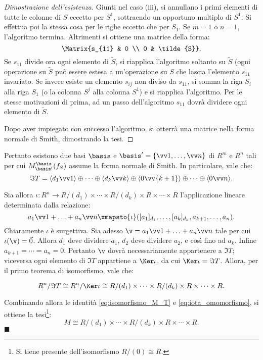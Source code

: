 \documentclass[12pt]{scrartcl}
\begin{document}
\begin{proof}[Dimostrazione dell'esistenza]
		
		Giunti nel caso (iii), si annullano i primi elementi di tutte le colonne
		di $S$ eccetto per $S^1$, sottraendo un opportuno multiplo di $S^1$. Si
		effettua poi la stessa cosa per le righe eccetto che per $S_1$. Se
		$m=1$ o $n=1$, l'algoritmo termina.
		Altrimenti si ottiene una matrice della forma:
		\[ \Matrix{s_{11} & 0 \\ 0 & \tilde{S}}. \]
		Se $s_{11}$ divide ora ogni elemento di $\tilde{S}$, si riapplica l'algoritmo
		soltanto su $\tilde{S}$ (ogni operazione su $\tilde{S}$ può essere estesa a
		un'operazione su $S$ che lascia l'elemento $s_{11}$ invariato. Se invece esiste
		un elemento $s_{ij}$ non diviso da $s_{11}$, si somma la riga $S_i$ alla
		riga $S_1$ (o la colonna $S^j$ alla colonna $S^1$) e si riapplica l'algoritmo.
		Per le stesse motivazioni di prima, ad un passo dell'algoritmo $s_{11}$ dovrà dividere
		ogni elemento di $\tilde{S}$. \medskip
		
		
		Dopo aver impiegato con successo l'algoritmo, si otterrà una matrice nella
		forma normale di Smith, dimostrando la tesi.
	\end{proof}
	
	Pertanto esistono due basi $\basis$ e $\basis' = \{ \vv 1, \ldots, \vv n \}$
	di $R^m$ e $R^n$ tali per cui $M^\basis_{\basis'}(f_S)$ assume la forma normale
	di Smith. In particolare, vale che:
	\[
		\Im T = \langle d_1 \vv 1 \rangle \oplus \cdots \oplus \langle d_k \vv k \rangle \oplus \langle 0 \vv{k+1} \rangle \oplus \cdots \oplus \langle 0 \vv n \rangle.
	\]


	Sia allora $\iota : R^n \to R/(d_1) \times \cdots \times R/(d_k)  \times R \times \cdots \times R$ l'applicazione lineare determinata dalla relazione:
	\[
		a_1 \vv 1 + \ldots + a_n \vv n \xmapsto{\iota} ([a_1]_{d_1}, \ldots, [a_k]_{d_k}, a_{k+1}, \ldots, a_n).
	\]
	Chiaramente $\iota$ è surgettiva. Sia adesso $\v = a_1 \vv 1 + \ldots + a_n \vv n$
	tale per cui $\iota(\v) = \vec 0$. Allora $d_1$ deve dividere $a_1$,
	$d_2$ deve dividere $a_2$, e così fino ad $a_k$. Infine $a_{k+1} = \cdots = a_n = 0$.
	Pertanto $\v$ dovrà necessariamente appartenere a $\Im T$; viceversa ogni elemento
	di $\Im T$ appartiene a $\Ker \iota$, da cui $\Ker \iota = \Im T$. Allora,
	per il primo teorema di isomorfismo, vale che:
	
	\begin{equation}
		\label{eq:iota_omomorfismo}
		R^n / \Im T \cong R^n / \Ker \iota \cong R/(d_1) \times \cdots \times R/(d_k) \times R \times \cdots \times R.
	\end{equation} \vskip 0.1in
	
	Combinando allora le identità \eqref{eq:isomorfismo_M_T} e \eqref{eq:iota_omomorfismo},
	si ottiene la tesi\footnote{
		Si tiene presente dell'isomorfismo $R/(0) \cong R$.
	}:
	\[
		M \cong R/(d_1) \times \cdots \times R/(d_k) \times R \times \cdots \times R.
	\]
	\hfill\ensuremath{\blacksquare}
\end{document}
